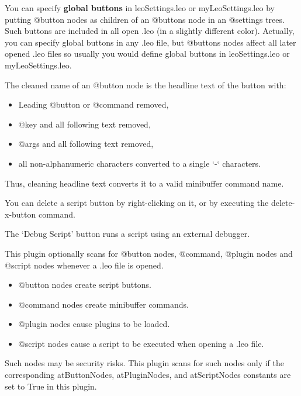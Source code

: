 \documentclass[a4paper,10pt,english]{sphinxmanual}
\begin{document}
You can specify \textbf{global buttons} in leoSettings.leo or myLeoSettings.leo by
putting @button nodes as children of an @buttons node in an @settings trees.
Such buttons are included in all open .leo (in a slightly different color).
Actually, you can specify global buttons in any .leo file, but @buttons nodes
affect all later opened .leo files so usually you would define global buttons in
leoSettings.leo or myLeoSettings.leo.

The cleaned name of an @button node is the headline text of the button with:
\begin{itemize}
\item {} 
Leading @button or @command removed,

\item {} 
@key and all following text removed,

\item {} 
@args and all following text removed,

\item {} 
all non-alphanumeric characters converted to a single `-` characters.

\end{itemize}

Thus, cleaning headline text converts it to a valid minibuffer command name.

You can delete a script button by right-clicking on it, or by
executing the delete-x-button command.

The `Debug Script' button runs a script using an external debugger.

This plugin optionally scans for @button nodes, @command, @plugin nodes and
@script nodes whenever a .leo file is opened.
\begin{itemize}
\item {} 
@button nodes create script buttons.

\item {} 
@command nodes create minibuffer commands.

\item {} 
@plugin nodes cause plugins to be loaded.

\item {} 
@script nodes cause a script to be executed when opening a .leo file.

\end{itemize}

Such nodes may be security risks. This plugin scans for such nodes only if the
corresponding atButtonNodes, atPluginNodes, and atScriptNodes constants are set
to True in this plugin.
\end{document}
